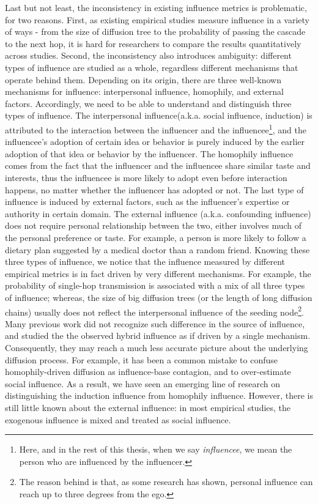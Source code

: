 \documentclass[phd,tocprelim]{cornell}
\begin{document}
Last but not least, the inconsistency in existing influence metrics is problematic, for two reasons. First, as existing empirical studies measure influence in a variety of ways - from the size of diffusion tree to the probability of passing the cascade to the next hop, it is hard for researchers to compare the results quantitatively across studies. Second, the inconsistency also introduces ambiguity: different types of influence are studied as a whole, regardless different mechanisms that operate behind them. Depending on its origin, there are three well-known mechanisms for influence: interpersonal influence, homophily, and external factors. Accordingly, we need to be able to understand and distinguish three types of influence. The interpersonal  influence(a.k.a. social influence, induction) is attributed to the interaction between the influencer and the influencee\footnote{Here, and in the rest of this thesis, when we say \emph{influencee}, we mean the person who are influenced by the influencer.}, and the influencee's adoption of certain idea or behavior is purely induced by the earlier adoption of that idea or behavior by the influencer. The homophily influence comes from the fact that the influencer and the influencee share similar taste and interests, thus the influencee is more likely to adopt even before interaction happens, no matter whether the influencer has adopted or not. The last type of influence is induced by external factors, such as the influencer's expertise or authority in certain domain. The external influence (a.k.a. confounding influence) does not require personal relationship between the two, either involves much of the personal preference or taste. For example, a person is more likely to follow a dietary plan suggested by a medical doctor than a random friend.
Knowing these three types of influence, we notice that the influence measured by different empirical metrics is in fact driven by very different mechanisms. For example, the probability of single-hop transmission is associated with a mix of all three types of influence; whereas, the size of big diffusion trees (or the length of long diffusion chains) usually does not reflect the interpersonal influence of the seeding node\cite{Sun-2009}\footnote{The reason behind is that, as some research has shown, personal influence can reach up to three degrees from the ego\cite{christakis-2011}.}. Many previous work did not recognize such difference in the source of influence, and studied the the observed hybrid influence as if driven by a single mechanism. Consequently, they may reach a much less accurate picture about the underlying diffusion process. For example, it has been a common mistake to confuse homophily-driven diffusion as influence-base contagion, and to over-estimate social influence. As a result, we have seen an emerging line of research on distinguishing the induction influence from homophily influence. However, there is still little known about the external influence: in most empirical studies, the exogenous influence is mixed and treated as social influence.
\end{document}
